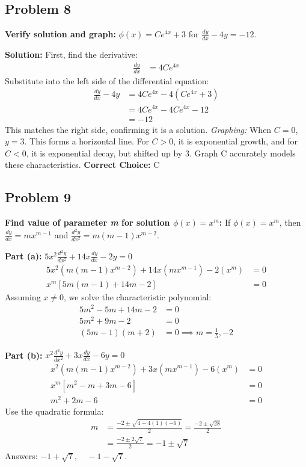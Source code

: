 \documentclass[12pt]{article}
\begin{document}
\subsection*{Problem 8}
\textbf{Verify solution and graph:} $\phi(x) = Ce^{4x} + 3$ for $\frac{dy}{dx} - 4y = -12$.

\textbf{Solution:}
First, find the derivative:
\begin{align*}
    \frac{dy}{dx} &= 4Ce^{4x}
\end{align*}
Substitute into the left side of the differential equation:
\begin{align*}
    \frac{dy}{dx} - 4y &= 4Ce^{4x} - 4(Ce^{4x} + 3) \\
    &= 4Ce^{4x} - 4Ce^{4x} - 12 \\
    &= -12
\end{align*}
This matches the right side, confirming it is a solution. 
\textit{Graphing:} When $C = 0$, $y = 3$. This forms a horizontal line. For $C > 0$, it is exponential growth, and for $C < 0$, it is exponential decay, but shifted up by 3. Graph C accurately models these characteristics.
\textbf{Correct Choice:} C

\subsection*{Problem 9}
\textbf{Find value of parameter \textit{m} for solution $\phi(x) = x^m$:}
If $\phi(x) = x^m$, then $\frac{dy}{dx} = mx^{m-1}$ and $\frac{d^2y}{dx^2} = m(m-1)x^{m-2}$.

\textbf{Part (a):} $5x^2\frac{d^2y}{dx^2} + 14x\frac{dy}{dx} - 2y = 0$
\begin{align*}
    5x^2(m(m-1)x^{m-2}) + 14x(mx^{m-1}) - 2(x^m) &= 0 \\
    x^m [5m(m-1) + 14m - 2] &= 0
\end{align*}
Assuming $x \neq 0$, we solve the characteristic polynomial:
\begin{align*}
    5m^2 - 5m + 14m - 2 &= 0 \\
    5m^2 + 9m - 2 &= 0 \\
    (5m - 1)(m + 2) &= 0 \implies m = \frac{1}{5}, -2
\end{align*}

\textbf{Part (b):} $x^2\frac{d^2y}{dx^2} + 3x\frac{dy}{dx} - 6y = 0$
\begin{align*}
    x^2(m(m-1)x^{m-2}) + 3x(mx^{m-1}) - 6(x^m) &= 0 \\
    x^m [m^2 - m + 3m - 6] &= 0 \\
    m^2 + 2m - 6 &= 0
\end{align*}
Use the quadratic formula:
\begin{align*}
    m &= \frac{-2 \pm \sqrt{4 - 4(1)(-6)}}{2} = \frac{-2 \pm \sqrt{28}}{2} \\
    &= \frac{-2 \pm 2\sqrt{7}}{2} = -1 \pm \sqrt{7}
\end{align*}
Answers: $-1 + \sqrt{7}, \quad -1 - \sqrt{7}$.
\end{document}
